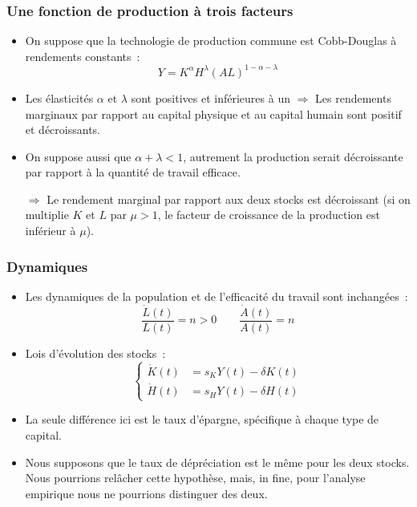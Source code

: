 \documentclass[10pt,notheorems]{beamer}
\theoremstyle{plain}
\theoremstyle{definition} %
\begin{document}
\begin{frame}
  \frametitle{Une fonction de production à trois facteurs}

  \begin{itemize}

  \item On suppose que la technologie de production commune est Cobb-Douglas à rendements constants~:
    \medskip
    \[
      Y = K^{\alpha}H^{\lambda}\left(AL\right)^{1-\alpha-\lambda}
    \]
    \medskip

  \item Les élasticités $\alpha$ et $\lambda$ sont positives et inférieures à un $\Rightarrow$ Les rendements marginaux par rapport au capital physique et au capital humain sont positif et décroissants.\newline

  \item On suppose aussi que $\alpha+\lambda<1$, autrement la production serait décroissante par rapport à la quantité de travail efficace.\newline

  \item[$\Rightarrow$] Le rendement marginal par rapport aux deux stocks est décroissant (si on multiplie $K$ et $L$ par $\mu>1$, le facteur de croissance de la production est inférieur à $\mu$).

  \end{itemize}

\end{frame}



\begin{frame}
  \frametitle{Dynamiques}

  \begin{itemize}

  \item Les dynamiques de la population et de l'efficacité du travail sont inchangées~:
    \[
      \frac{\dot L(t)}{L(t)} = n >0 \quad\quad \frac{\dot A(t)}{A(t)} = n
    \]

    \medskip

  \item Lois d'évolution des stocks~:
    \[
      \begin{cases}
        \dot K(t) &= s_K Y(t) - \delta K(t)\\
        \dot H(t) &= s_H Y(t) - \delta H(t)
      \end{cases}
    \]

  \item La seule différence ici est le taux d'épargne, spécifique à chaque type de capital.\newline

  \item Nous supposons que le taux de dépréciation est le même pour les deux stocks. Nous pourrions relâcher cette hypothèse, mais, in fine, pour l'analyse empirique nous ne pourrions distinguer des deux.

  \end{itemize}

\end{frame}
\end{document}
